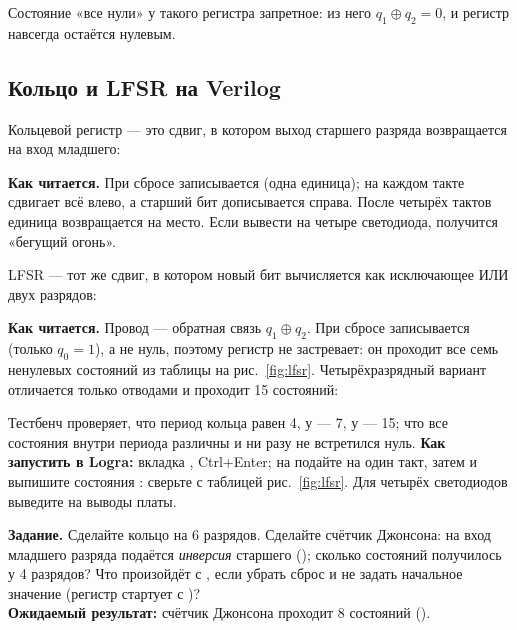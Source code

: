 Состояние «все нули» у такого регистра запретное: из него $q_1\oplus q_2=0$,
и регистр навсегда остаётся нулевым.

\subsection{Кольцо и LFSR на Verilog}
\label{sec:regs-lfsr-v}

Кольцевой регистр --- это сдвиг, в котором выход старшего разряда возвращается
на вход младшего:


\textbf{Как читается.} При сбросе записывается  (одна единица); на
каждом такте  сдвигает всё влево, а старший бит
дописывается справа. После четырёх тактов единица возвращается на место.
Если вывести  на четыре светодиода, получится «бегущий огонь».

LFSR --- тот же сдвиг, в котором новый бит вычисляется как исключающее ИЛИ
двух разрядов:


\textbf{Как читается.} Провод  --- обратная связь $q_1\oplus q_2$.
При сбросе записывается  (только $q_0=1$), а не нуль, поэтому
регистр не застревает: он проходит все семь ненулевых состояний из таблицы на
рис.~\ref{fig:lfsr}. Четырёхразрядный вариант отличается только отводами и
проходит 15 состояний:


Тестбенч  проверяет, что период кольца равен 4, у
 --- 7, у  --- 15; что все состояния внутри периода
различны и ни разу не встретился нуль. \textbf{Как запустить в Logra:}
вкладка , Ctrl+Enter; на  подайте  на
один такт, затем  и выпишите состояния : сверьте с таблицей
рис.~\ref{fig:lfsr}. Для четырёх светодиодов выведите  на выводы платы.

\begin{diybox}
\textbf{Задание.}  Сделайте кольцо на 6 разрядов.  Сделайте
счётчик Джонсона: на вход младшего разряда подаётся \emph{инверсия} старшего
(); сколько состояний получилось у 4
разрядов?  Что произойдёт с , если убрать сброс и не
задать начальное значение (регистр стартует с )?\\
\textbf{Ожидаемый результат:} счётчик Джонсона проходит 8 состояний
().
\end{diybox}


